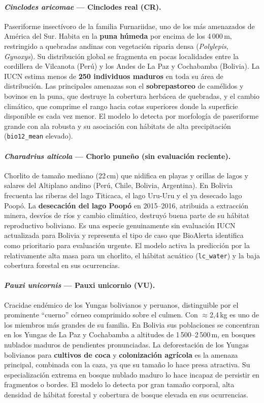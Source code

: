 \documentclass[12pt,a4paper]{article}
\begin{document}
\paragraph{\textit{Cinclodes aricomae} --- Cinclodes real (CR).}
Paseriforme insectívoro de la familia Furnariidae, uno de los más amenazados de América del Sur.
Habita en la \textbf{puna húmeda} por encima de los 4\,000\,m,
restringido a quebradas andinas con vegetación riparia densa (\textit{Polylepis}, \textit{Gynoxys}).
Su distribución global se fragmenta en pocas localidades entre la cordillera de Vilcanota (Perú)
y los Andes de La Paz y Cochabamba (Bolivia).
La IUCN estima menos de \textbf{250 individuos maduros} en toda su área de distribución.
Las principales amenazas son el \textbf{sobrepastoreo} de camélidos y bovinos en la puna,
que destruye la cobertura herbácea de quebradas, y el cambio climático, que comprime
el rango hacia cotas superiores donde la superficie disponible es cada vez menor.
El modelo lo detecta por morfología de paseriforme grande con ala robusta y
su asociación con hábitats de alta precipitación (\texttt{bio12\_mean} elevado).

\paragraph{\textit{Charadrius alticola} --- Chorlo puneño (sin evaluación reciente).}
Chorlito de tamaño mediano (22\,cm) que nidifica en playas y orillas de lagos y
salares del Altiplano andino (Perú, Chile, Bolivia, Argentina).
En Bolivia frecuenta las riberas del lago Titicaca, el lago Uru-Uru y el ya desecado
lago Poopó.
La \textbf{desecación del lago Poopó} en 2015--2016, atribuida a extracción minera,
desvíos de ríos y cambio climático, destruyó buena parte de su hábitat reproductivo
boliviano.
Es una especie genuinamente sin evaluación IUCN actualizada para Bolivia
y representa el tipo de caso que BioAlerta identifica como prioritario para evaluación
urgente.
El modelo activa la predicción por la relativamente alta masa para un chorlito,
el hábitat acuático (\texttt{lc\_water}) y la baja cobertura forestal en sus
ocurrencias.

\paragraph{\textit{Pauxi unicornis} --- Pauxi unicornio (VU).}
Cracidae endémico de los Yungas bolivianos y peruanos, distinguible por el prominente
``cuerno'' córneo comprimido sobre el culmen.
Con $\approx$2,4\,kg es uno de los miembros más grandes de su familia.
En Bolivia sus poblaciones se concentran en los Yungas de La Paz y Cochabamba
a altitudes de 1\,500--2\,500\,m, en bosques nublados maduros de pendientes pronunciadas.
La deforestación de los Yungas bolivianos para \textbf{cultivos de coca} y
\textbf{colonización agrícola} es la amenaza principal, combinada con la caza,
ya que su tamaño lo hace presa atractiva.
Su especialización extrema en bosque nublado maduro lo hace incapaz de persistir
en fragmentos o bordes.
El modelo lo detecta por gran tamaño corporal, alta densidad de hábitat forestal y
cobertura de bosque elevada en sus ocurrencias.
\end{document}
